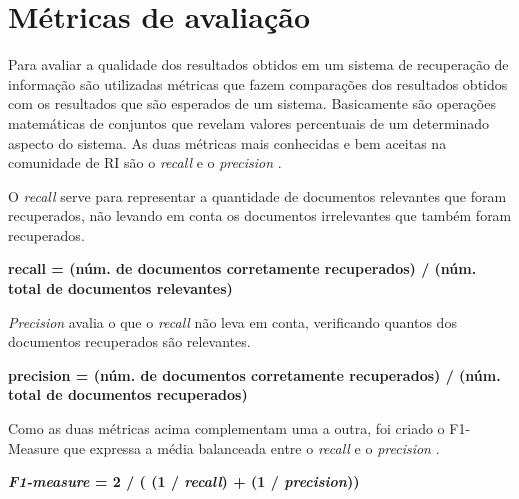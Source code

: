 \section{Métricas de avaliação}
Para avaliar a qualidade dos resultados obtidos em um sistema de recuperação de informação são utilizadas métricas que fazem comparações dos resultados obtidos com os resultados que são esperados de um sistema. Basicamente são operações matemáticas de conjuntos que revelam valores percentuais de um determinado aspecto do sistema. As duas métricas mais conhecidas e bem aceitas na comunidade de RI são o \emph{recall} e o \emph{precision} \cite{Turpin2006}.

O \emph{recall} serve para representar a quantidade de documentos relevantes que foram recuperados, não levando em conta os documentos irrelevantes que também foram recuperados.
\\
\begin{center}
\textbf{
recall = (núm. de documentos corretamente recuperados) / (núm. total de documentos relevantes)
}
\end{center}

\emph{Precision} avalia o que o \emph{recall} não leva em conta, verificando quantos dos documentos recuperados são relevantes.
\begin{center}
\textbf{
precision = (núm. de documentos corretamente recuperados) / (núm. total de documentos recuperados)
}
\end{center}

Como as duas métricas acima complementam uma a outra, foi criado o F1-Measure que expressa a média balanceada entre o \emph{recall} e o \emph{precision} \cite{Feldman2007}.

\begin{center}
\textbf{
\emph{F1-measure} = 2 / ( (1 / \emph{recall}) + (1 / \emph{precision}))
}
\end{center}


